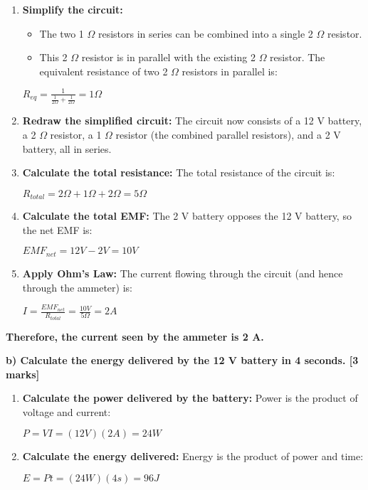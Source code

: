 \documentclass{article}
\begin{document}
\begin{enumerate}
\item \textbf{Simplify the circuit:} 
    \begin{itemize}
    \item The two 1 $\Omega$ resistors in series can be combined into a single 2 $\Omega$ resistor. 
    \item This 2 $\Omega$ resistor is in parallel with the existing 2 $\Omega$ resistor. The equivalent resistance of two 2 $\Omega$ resistors in parallel is:
    \end{itemize}
    
    $R_{eq} = \frac{1}{\frac{1}{2\Omega} + \frac{1}{2\Omega}} = 1 \Omega$

\item \textbf{Redraw the simplified circuit:} The circuit now consists of a 12 V battery, a 2 $\Omega$ resistor, a 1 $\Omega$ resistor (the combined parallel resistors), and a 2 V battery, all in series.

\item \textbf{Calculate the total resistance:} The total resistance of the circuit is:

    $R_{total} = 2 \Omega + 1 \Omega + 2 \Omega = 5 \Omega$

\item \textbf{Calculate the total EMF:} The 2 V battery opposes the 12 V battery, so the net EMF is:

    $EMF_{net} = 12 V - 2 V = 10 V$

\item \textbf{Apply Ohm's Law:}  The current flowing through the circuit (and hence through the ammeter) is:

    $I = \frac{EMF_{net}}{R_{total}} = \frac{10 V}{5 \Omega} = 2 A$ 
\end{enumerate}

\textbf{Therefore, the current seen by the ammeter is 2 A.}


\textbf{b) Calculate the energy delivered by the 12 V battery in 4 seconds. [3 marks]}

\begin{enumerate}
\item \textbf{Calculate the power delivered by the battery:} Power is the product of voltage and current:

    $P = VI = (12 V)(2 A) = 24 W$

\item \textbf{Calculate the energy delivered:} Energy is the product of power and time:

    $E = Pt = (24 W)(4 s) = 96 J$
\end{enumerate}
\end{document}
